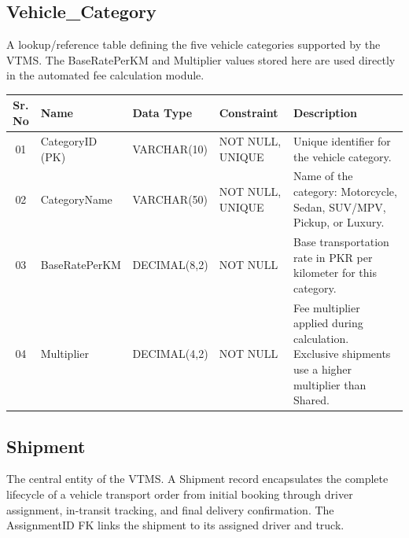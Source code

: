 \documentclass[12pt,a4paper]{report}
\begin{document}

\subsection{Vehicle\_Category}

A lookup/reference table defining the five vehicle categories supported by the VTMS. The BaseRatePerKM and Multiplier values stored here are used directly in the automated fee calculation module.

\begin{longtable}{|c|p{3.5cm}|p{2.5cm}|p{3.5cm}|p{5cm}|}
\hline
\textbf{Sr. No} & \textbf{Name} & \textbf{Data Type} & \textbf{Constraint} & \textbf{Description} \\
\hline
01 & CategoryID (PK) & VARCHAR(10) & NOT NULL, UNIQUE & Unique identifier for the vehicle category. \\
\hline
02 & CategoryName & VARCHAR(50) & NOT NULL, UNIQUE & Name of the category: Motorcycle, Sedan, SUV/MPV, Pickup, or Luxury. \\
\hline
03 & BaseRatePerKM & DECIMAL(8,2) & NOT NULL & Base transportation rate in PKR per kilometer for this category. \\
\hline
04 & Multiplier & DECIMAL(4,2) & NOT NULL & Fee multiplier applied during calculation. Exclusive shipments use a higher multiplier than Shared. \\
\hline
\end{longtable}

\subsection{Shipment}

The central entity of the VTMS. A Shipment record encapsulates the complete lifecycle of a vehicle transport order from initial booking through driver assignment, in-transit tracking, and final delivery confirmation. The AssignmentID FK links the shipment to its assigned driver and truck.
\end{document}
